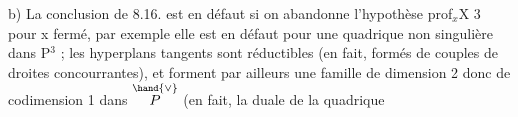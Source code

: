 b) La conclusion de 8.16. est en défaut si on abandonne
l'hypothèse prof$_x$X \hand{$\geqslant$} 3 pour x fermé, par exemple elle est en défaut pour
une quadrique non singulière  dans P$^3$ ;   les hyperplans tangents
 sont  réductibles (en fait, formés de couples de droites
concourrantes), et forment par ailleurs une famille de dimension 2
 donc de codimension 1 dans $\overset{\hand{\vee}}{P}$ (en fait, la duale de la quadrique  
